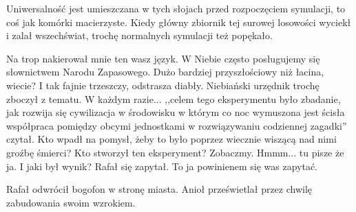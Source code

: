 Uniwersalność jest umieszczana w tych słojach przed rozpoczęciem symulacji, to coś jak komórki macierzyste.
Kiedy główny zbiornik tej surowej losowości wyciekł i zalał wszechświat, trochę normalnych symulacji też popękało.
\begin{dialogue}
	\ds{} Na trop nakierował mnie ten wasz język. W Niebie często posługujemy się słownictwem Narodu Zapasowego. Dużo bardziej przyszłościowy niż łacina, wiecie? I tak fajnie trzeszczy, odstrasza diabły.
		\dm{} Niebiański urzędnik trochę zboczył z tematu.
		\dm{} W każdym razie... ,,celem tego eksperymentu było zbadanie, jak rozwija się cywilizacja w środowisku w którym co noc wymuszona jest ścisła współpraca pomiędzy obcymi jednostkami w rozwiązywaniu codziennej zagadki''
		\dm{} czytał.
		\dm{} Kto wpadł na pomysł, żeby to było poprzez wiecznie wiszącą nad nimi groźbę śmierci? Kto stworzył ten eksperyment? Zobaczmy. Hmmm... tu pisze że ja.
	\ds{} I jaki był wynik? 
		\dm{} Rafał się zapytał.
	\ds{} To ja powinienem się was zapytać.
\end{dialogue}
Rafał odwrócił bogofon w stronę miasta. Anioł prześwietlał przez chwilę zabudowania swoim wzrokiem.
